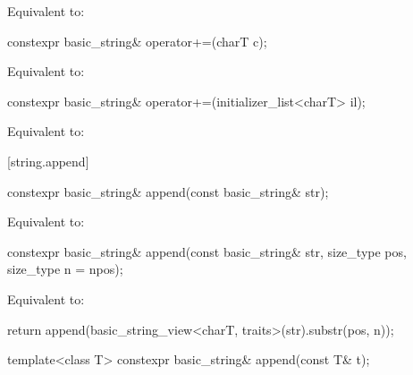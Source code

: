 \begin{itemdescr}
\pnum
\effects
Equivalent to: 
\end{itemdescr}

%
\begin{itemdecl}
constexpr basic_string& operator+=(charT c);
\end{itemdecl}

\begin{itemdescr}
\pnum
\effects
Equivalent to: 
\end{itemdescr}

%
\begin{itemdecl}
constexpr basic_string& operator+=(initializer_list<charT> il);
\end{itemdecl}

\begin{itemdescr}
\pnum
\effects
Equivalent to: 
\end{itemdescr}


[string.append]{}

%
\begin{itemdecl}
constexpr basic_string& append(const basic_string& str);
\end{itemdecl}

\begin{itemdescr}
\pnum
\effects
Equivalent to: 
\end{itemdescr}

%
\begin{itemdecl}
constexpr basic_string& append(const basic_string& str, size_type pos, size_type n = npos);
\end{itemdecl}

\begin{itemdescr}
\pnum
\effects
Equivalent to:
\begin{codeblock}
return append(basic_string_view<charT, traits>(str).substr(pos, n));
\end{codeblock}
\end{itemdescr}

%
\begin{itemdecl}
template<class T>
  constexpr basic_string& append(const T& t);
\end{itemdecl}

